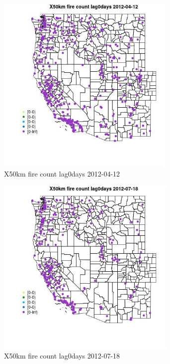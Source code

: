 \begin{figure} 
\centering  
\includegraphics[width=0.77\textwidth]{Code_Outputs/Report_ML_input_PM25_Step4_part_e_de_duplicated_aves_compiled_2019-05-14wNAs_MapObsX50km_fire_count_lag0days2012-04-12.jpg} 
\caption{\label{fig:Report_ML_input_PM25_Step4_part_e_de_duplicated_aves_compiled_2019-05-14wNAsMapObsX50km_fire_count_lag0days2012-04-12}X50km fire count lag0days 2012-04-12} 
\end{figure} 
 

\begin{figure} 
\centering  
\includegraphics[width=0.77\textwidth]{Code_Outputs/Report_ML_input_PM25_Step4_part_e_de_duplicated_aves_compiled_2019-05-14wNAs_MapObsX50km_fire_count_lag0days2012-07-18.jpg} 
\caption{\label{fig:Report_ML_input_PM25_Step4_part_e_de_duplicated_aves_compiled_2019-05-14wNAsMapObsX50km_fire_count_lag0days2012-07-18}X50km fire count lag0days 2012-07-18} 
\end{figure} 
 

